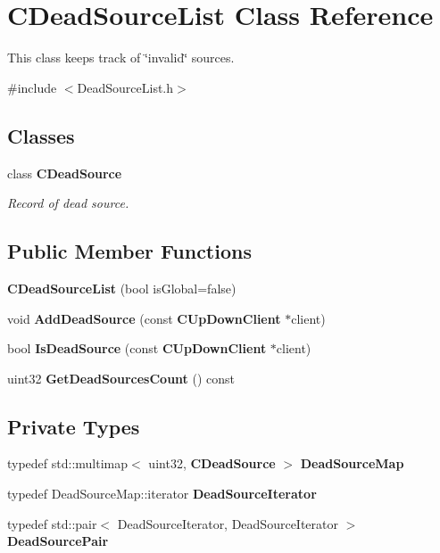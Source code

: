 \section{CDeadSourceList Class Reference}
\label{classCDeadSourceList}


This class keeps track of \char`\"{}invalid\char`\"{} sources.  


{\ttfamily \#include $<$DeadSourceList.h$>$}\subsection*{Classes}
\begin{DoxyCompactItemize}
\item 
class {\bf CDeadSource}
\begin{DoxyCompactList}\small\item\em Record of dead source. \item\end{DoxyCompactList}\end{DoxyCompactItemize}
\subsection*{Public Member Functions}
\begin{DoxyCompactItemize}
\item 
{\bf CDeadSourceList} (bool isGlobal=false)
\item 
void {\bf AddDeadSource} (const {\bf CUpDownClient} $\ast$client)\label{classCDeadSourceList_a55bdfe27e730f01f12d7df628152772a}

\item 
bool {\bf IsDeadSource} (const {\bf CUpDownClient} $\ast$client)\label{classCDeadSourceList_ad8bb4f5ab9e3c53ed7fbc9eb7c5acc4e}

\item 
uint32 {\bf GetDeadSourcesCount} () const \label{classCDeadSourceList_ae11949b139cf91a37ff8dac539ba8d5b}

\end{DoxyCompactItemize}
\subsection*{Private Types}
\begin{DoxyCompactItemize}
\item 
typedef std::multimap$<$ uint32, {\bf CDeadSource} $>$ {\bfseries DeadSourceMap}\label{classCDeadSourceList_a89c3e94dac1231234f49ad2e8e4144c2}

\item 
typedef DeadSourceMap::iterator {\bfseries DeadSourceIterator}\label{classCDeadSourceList_aeab2030b79cff1557d75ac3d0152ec01}

\item 
typedef std::pair$<$ DeadSourceIterator, DeadSourceIterator $>$ {\bfseries DeadSourcePair}\label{classCDeadSourceList_a868860b3ae63253f79159e615c0099c5}

\end{DoxyCompactItemize}
